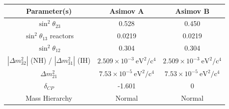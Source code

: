 \begin{tabular}{| c | c | c |}
\hline
Parameter(s) &	Asimov A & Asimov B	\\
\hline
$\sin^{2}\theta_{23}$	&	0.528	&  0.450	\\%
$\sin^{2} \theta_{13}$ reactors	&	0.0219	&	0.0219	\\
$\sin^{2} \theta_{12}$	&	0.304	&	0.304	\\
$|\Delta m^{2}_{32}|$ (NH) / $|\Delta m^{2}_{31}|$ (IH)	&	$2.509 \times 10^{-3}~\mbox{eV}^2/\mbox{c}^4$	&	$2.509 \times 10^{-3}~\mbox{eV}^2/\mbox{c}^4$	\\
$\Delta m^{2}_{21}$	&	$7.53 \times 10^{-5}~\mbox{eV}^2/\mbox{c}^4$	&	$7.53 \times 10^{-5}~\mbox{eV}^2/\mbox{c}^4$	\\
$\delta_{CP}$	&	-1.601	&	0	\\
Mass Hierarchy	&	Normal	&	Normal	\\  
\hline
\end{tabular}